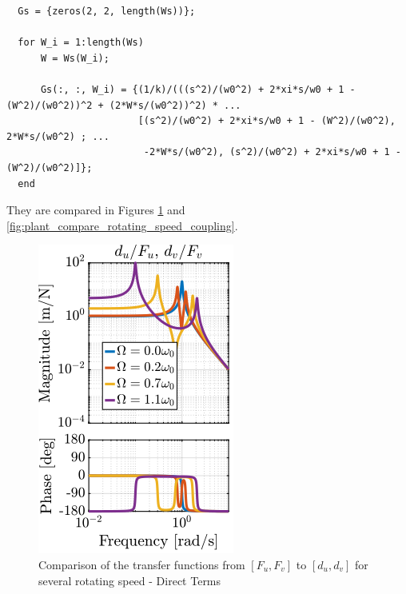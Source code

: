 \documentclass[a4paper, 10pt, DIV=12, parskip=full]{scrreprt}
\begin{document}
\begin{verbatim}
  Gs = {zeros(2, 2, length(Ws))};

  for W_i = 1:length(Ws)
      W = Ws(W_i);

      Gs(:, :, W_i) = {(1/k)/(((s^2)/(w0^2) + 2*xi*s/w0 + 1 - (W^2)/(w0^2))^2 + (2*W*s/(w0^2))^2) * ...
                       [(s^2)/(w0^2) + 2*xi*s/w0 + 1 - (W^2)/(w0^2), 2*W*s/(w0^2) ; ...
                        -2*W*s/(w0^2), (s^2)/(w0^2) + 2*xi*s/w0 + 1 - (W^2)/(w0^2)]};
  end
\end{verbatim}

They are compared in Figures \ref{fig:plant_compare_rotating_speed_direct} and \ref{fig:plant_compare_rotating_speed_coupling}.

\begin{figure}[htbp]
\centering
\includegraphics[scale=1]{figs/plant_compare_rotating_speed_direct.png}
\caption{\label{fig:plant_compare_rotating_speed_direct}Comparison of the transfer functions from \([F_u, F_v]\) to \([d_u, d_v]\) for several rotating speed - Direct Terms}
\end{figure}
\end{document}
